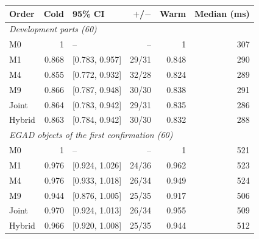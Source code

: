 \begin{tabular}{lrlrrr}
\toprule
Order & Cold & 95\% CI & $+$/$-$ & Warm & Median (ms) \\
\midrule
\multicolumn{6}{l}{\emph{Development parts (60)}} \\
M0 & 1 & -- & -- & 1 & 307 \\
M1 & 0.868 & [0.783, 0.957] & 29/31 & 0.848 & 290 \\
M4 & 0.855 & [0.772, 0.932] & 32/28 & 0.824 & 289 \\
M9 & 0.866 & [0.787, 0.948] & 30/30 & 0.838 & 291 \\
Joint & 0.864 & [0.783, 0.942] & 29/31 & 0.835 & 286 \\
Hybrid & 0.863 & [0.784, 0.942] & 30/30 & 0.832 & 288 \\
\multicolumn{6}{l}{\emph{EGAD objects of the first confirmation (60)}} \\
M0 & 1 & -- & -- & 1 & 521 \\
M1 & 0.976 & [0.924, 1.026] & 24/36 & 0.962 & 523 \\
M4 & 0.976 & [0.933, 1.018] & 26/34 & 0.949 & 524 \\
M9 & 0.944 & [0.876, 1.005] & 25/35 & 0.917 & 506 \\
Joint & 0.970 & [0.924, 1.013] & 26/34 & 0.955 & 509 \\
Hybrid & 0.966 & [0.920, 1.008] & 25/35 & 0.944 & 512 \\
\bottomrule
\end{tabular}

